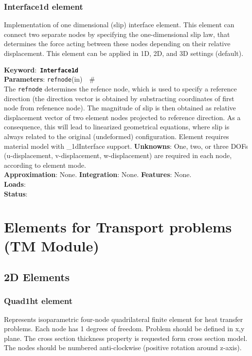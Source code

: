 \documentclass[a4paper]{article}
\newcommand{\descitem}[1]{{\noindent \bf #1}:}
\newcommand{\elemkeyword}[1]{\descitem{Keyword}~{\bf \texttt{#1}}}
\newcommand{\elemparam}[2]{{{\texttt{#1}\tiny (#2)}~~\#}}
\newcommand{\param}[1]{{\texttt{#1}}}
\begin{document}
\subsubsection{Interface1d element}
Implementation of one dimensional (slip) interface element. 
This element can connect two separate nodes by specifying the
one-dimensional slip law, that determines the force acting between
these nodes depending on their relative displacement. This element can
be applied in 1D, 2D, and 3D settings (default).

\elemkeyword{Interface1d}\\
\descitem{Parameters} \elemparam{refnode}{in}\\
The \param{refnode} determines the refence node, which is used to
specify a reference direction (the direction vector is obtained by
substracting coordinates of first node from refenence node).
The magnitude of slip is then obtained as relative displacement vector
of two element nodes projected to reference direction. As a
consequence, this will lead to linearized geometrical equations, where
slip is always related to the original (undeformed) configuration.
Element requires material model with \_1dInterface support.
\descitem{Unknowns}
One, two, or three DOFs (u-displacement, v-displacement,
w-displacement) are required in each node, according to element mode.\\
\descitem{Approximation} None.
\descitem{Integration} None.
\descitem{Features} None.\\
\descitem{Loads} \\
\descitem{Status} 



\section{Elements for Transport problems\\(TM Module)}
\subsection{2D Elements}
\subsubsection{Quad1ht element}
\label{Quad1ht}
Represents isoparametric four-node quadrilateral finite element for
heat transfer problems. Each node has 1 degrees of freedom.
Problem should be defined in x,y plane. The cross section thickness
property is requested form cross section model.
The nodes should be numbered anti-clockwise (positive rotation around
z-axis). 
\end{document}
